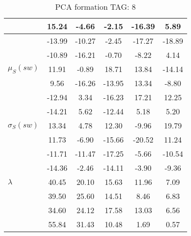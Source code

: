 \begin{table}[h!]
\begin{center}
\begin{tabular}{| l | c | c | c | c | c |}
 & 15.24  & -4.66  & -2.15  & -16.39  & 5.89 \\\hline
 & -13.99  & -10.27  & -2.45  & -17.27  & -18.89 \\\hline
 & -10.89  & -16.21  & -0.70  & -8.22  & 4.14 \\\hline
$\mu_S(sw)$ & 11.91  & -0.89  & 18.71  & 13.84  & -14.14 \\\hline
 & 9.56  & -16.26  & -13.95  & 13.34  & -8.80 \\\hline
 & -12.94  & 3.34  & -16.23  & 17.21  & 12.25 \\\hline
 & -14.21  & 5.62  & -12.44  & 5.18  & 5.20 \\\hline
$\sigma_S(sw)$ & 13.34  & 4.78  & 12.30  & -9.96  & 19.79 \\\hline
 & 11.73  & -6.90  & -15.66  & -20.52  & 11.24 \\\hline
 & -11.71  & -11.47  & -17.25  & -5.66  & -10.54 \\\hline
 & -14.36  & -2.46  & -14.11  & -3.90  & -9.36 \\\hline
$\lambda$ & 40.45  & 20.10  & 15.63  & 11.96  & 7.09 \\\hline
 & 39.50  & 25.60  & 14.51  & 8.46  & 6.83 \\\hline
 & 34.60  & 24.12  & 17.58  & 13.03  & 6.56 \\\hline
 & 55.84  & 31.43  & 10.48  & 1.69  & 0.57 \\\hline
\end{tabular}
\caption{PCA formation TAG: 8}
\end{center}
\end{table}